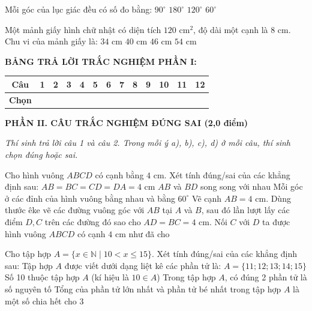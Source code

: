 \documentclass[12pt,a4paper]{article}
\begin{document}
\begin{ex}
Mỗi góc của lục giác đều có số đo bằng:
\choice
{$90^\circ$}
{$180^\circ$}
{\True $120^\circ$}
{$60^\circ$}
\end{ex}

\begin{ex}
Một mảnh giấy hình chữ nhật có diện tích $120\text{ cm}^2$, độ dài một cạnh là $8\text{ cm}$. Chu vi của mảnh giấy là:
\choice
{$34\text{ cm}$}
{$40\text{ cm}$}
{\True $46\text{ cm}$}
{$54\text{ cm}$}
\end{ex}


\vspace{1mm}
\noindent\textbf{BẢNG TRẢ LỜI TRẮC NGHIỆM PHẦN I:}
\begin{center}
\begin{tabular}{|c|c|c|c|c|c|c|c|c|c|c|c|c|}
\hline
\textbf{Câu} & \textbf{1} & \textbf{2} & \textbf{3} & \textbf{4} & \textbf{5} & \textbf{6} & \textbf{7} & \textbf{8} & \textbf{9} & \textbf{10} & \textbf{11} & \textbf{12} \\
\hline
\textbf{Chọn} & \rule{0pt}{0.65cm} & & & & & & & & & & & \\
\hline
\end{tabular}
\end{center}
\vspace{2mm}

\setcounter{ex}{0}
\noindent\textbf{\large PHẦN II. CÂU TRẮC NGHIỆM ĐÚNG SAI (2,0 điểm)}

\textit{Thí sinh trả lời câu 1 và câu 2. Trong mỗi ý a), b), c), d) ở mỗi câu, thí sinh chọn đúng hoặc sai.}

\vspace{1mm}
\begin{ex}
Cho hình vuông $ABCD$ có cạnh bằng $4\text{ cm}$. Xét tính đúng/sai của các khẳng định sau:
\choiceTF
{\True $AB = BC = CD = DA = 4\text{ cm}$}
{$AB$ và $BD$ song song với nhau}
{Mỗi góc ở các đỉnh của hình vuông bằng nhau và bằng $60^\circ$}
{\True Vẽ cạnh $AB = 4\text{ cm}$. Dùng thước êke vẽ các đường vuông góc với $AB$ tại $A$ và $B$, sau đó lần lượt lấy các điểm $D, C$ trên các đường đó sao cho $AD = BC = 4\text{ cm}$. Nối $C$ với $D$ ta được hình vuông $ABCD$ có cạnh $4\text{ cm}$ như đã cho}
\end{ex}

\begin{ex}
Cho tập hợp $A = \{x \in \mathbb{N} \mid 10 < x \le 15\}$. Xét tính đúng/sai của các khẳng định sau:
\choiceTF
{\True Tập hợp $A$ được viết dưới dạng liệt kê các phần tử là: $A = \{11; 12; 13; 14; 15\}$}
{Số 10 thuộc tập hợp $A$ (kí hiệu là $10 \in A$)}
{\True Trong tập hợp $A$, có đúng 2 phần tử là số nguyên tố}
{Tổng của phần tử lớn nhất và phần tử bé nhất trong tập hợp $A$ là một số chia hết cho 3}
\end{ex}
\end{document}
